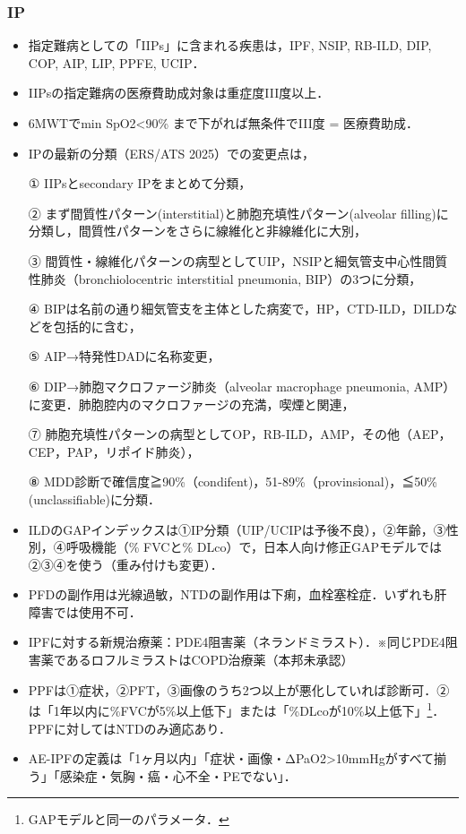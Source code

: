 \subsubsection{IP}

\begin{itemize}
\item 指定難病としての「IIPs」に含まれる疾患は，IPF, NSIP, RB-ILD, DIP, COP, AIP, LIP, PPFE, UCIP．
\item IIPsの指定難病の医療費助成対象は重症度III度以上．
\item 6MWTでmin SpO2<90\% まで下がれば無条件でIII度 = 医療費助成．
\item IPの最新の分類（ERS/ATS 2025）での変更点は，

① IIPsとsecondary IPをまとめて分類，

② まず間質性パターン(interstitial)と肺胞充填性パターン(alveolar filling)に分類し，間質性パターンをさらに線維化と非線維化に大別，

③ 間質性・線維化パターンの病型としてUIP，NSIPと細気管支中心性間質性肺炎（bronchiolocentric interstitial pneumonia, BIP）の3つに分類，

④ BIPは名前の通り細気管支を主体とした病変で，HP，CTD-ILD，DILDなどを包括的に含む，

⑤ AIP→特発性DADに名称変更，

⑥ DIP→肺胞マクロファージ肺炎（alveolar macrophage pneumonia, AMP）に変更．肺胞腔内のマクロファージの充満，喫煙と関連，

⑦ 肺胞充填性パターンの病型としてOP，RB-ILD，AMP，その他（AEP，CEP，PAP，リポイド肺炎），

⑧ MDD診断で確信度≧90\%（condifent)，51-89\%（provinsional)，≦50\% (unclassifiable)に分類．

\item ILDのGAPインデックスは①IP分類（UIP/UCIPは予後不良），②年齢，③性別，④呼吸機能（\% FVCと\% DLco）で，日本人向け修正GAPモデルでは②③④を使う（重み付けも変更）．

\item PFDの副作用は光線過敏，NTDの副作用は下痢，血栓塞栓症．いずれも肝障害では使用不可．
\item IPFに対する新規治療薬：PDE4阻害薬（ネランドミラスト）．※同じPDE4阻害薬であるロフルミラストはCOPD治療薬（本邦未承認）
\item PPFは①症状，②PFT，③画像のうち2つ以上が悪化していれば診断可．②は「1年以内に\%FVCが5\%以上低下」または「\%DLcoが10\%以上低下」\footnote{GAPモデルと同一のパラメータ．}．PPFに対してはNTDのみ適応あり．

\item AE-IPFの定義は「1ヶ月以内」「症状・画像・ΔPaO2>10mmHgがすべて揃う」「感染症・気胸・癌・心不全・PEでない」．

\end{itemize}

